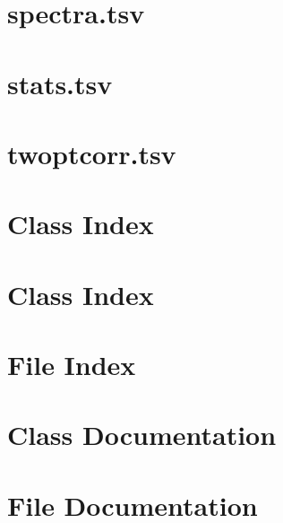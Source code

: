 \documentclass[letterpaper]{book}
\begin{document}
\chapter{spectra.tsv}
\label{spectra_tsv}
\hypertarget{spectra_tsv}{}

\chapter{stats.tsv}
\label{stats_tsv}
\hypertarget{stats_tsv}{}

\chapter{twoptcorr.tsv}
\label{twoptcorr_tsv}
\hypertarget{twoptcorr_tsv}{}

\chapter{Class Index}

\chapter{Class Index}

\chapter{File Index}

\chapter{Class Documentation}






























\chapter{File Documentation}
























\printindex
\end{document}
